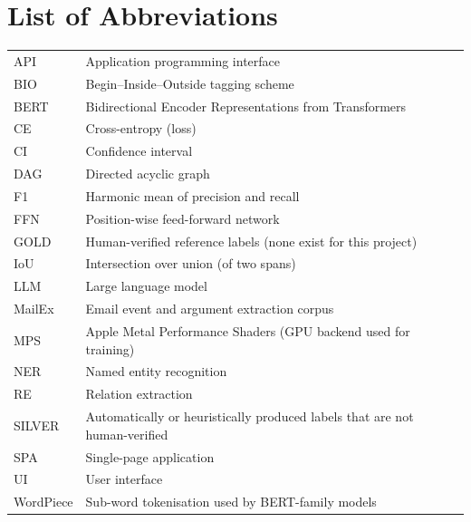 \chapter*{List of Abbreviations}
\begin{tabular}{@{}p{30mm}p{115mm}@{}}
API & Application programming interface \\
BIO & Begin--Inside--Outside tagging scheme \\
BERT & Bidirectional Encoder Representations from Transformers \\
CE & Cross-entropy (loss) \\
CI & Confidence interval \\
DAG & Directed acyclic graph \\
F1 & Harmonic mean of precision and recall \\
FFN & Position-wise feed-forward network \\
GOLD & Human-verified reference labels (none exist for this project) \\
IoU & Intersection over union (of two spans) \\
LLM & Large language model \\
MailEx & Email event and argument extraction corpus \citep{srivastava2023mailex} \\
MPS & Apple Metal Performance Shaders (GPU backend used for training) \\
NER & Named entity recognition \\
RE & Relation extraction \\
SILVER & Automatically or heuristically produced labels that are not human-verified \\
SPA & Single-page application \\
UI & User interface \\
WordPiece & Sub-word tokenisation used by BERT-family models \\
\end{tabular}
